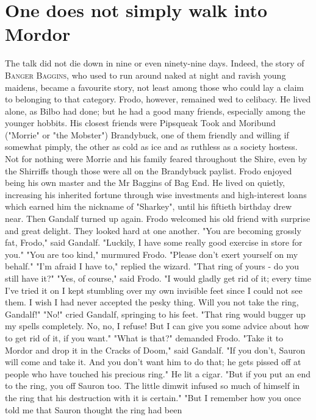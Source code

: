 \chapter[Concerning the Ring]{One does not simply walk into Mordor}

The talk did not die down in nine or even ninety-nine days. Indeed, the
story of \textcolor{RawSienna}{\textsc{\LARGE Banger Baggins}}, who used to run around naked at night and ravish
young maidens, became a favourite story, not least among those who could lay
a claim to belonging to that category. Frodo, however, remained wed to
celibacy. He lived alone, as Bilbo had done; but he had a good many friends,
especially among the younger hobbits. His closest friends were Pipsqueak
Took and Moribund ("Morrie" or "the Mobster") Brandybuck, one of them
friendly and willing if somewhat pimply, the other as cold as ice and as
ruthless as a society hostess. Not for nothing were Morrie and his family
feared throughout the Shire, even by the Shirriffs though those were all on
the Brandybuck paylist.
  Frodo enjoyed being his own master and the Mr Baggins of Bag End. He
lived on quietly, increasing his inherited fortune through wise investments
and high-interest loans which earned him the nickname of "Sharkey", until
his fiftieth birthday drew near. Then Gandalf turned up again. Frodo
welcomed his old friend with surprise and great delight. They looked hard at
one another.
  "You are becoming grossly fat, Frodo," said Gandalf. "Luckily, I have some
really good exercise in store for you."
  "You are too kind," murmured Frodo. "Please don't exert yourself on my
behalf."
  "I'm afraid I have to," replied the wizard. "That ring of yours - do you
still have it?"
  "Yes, of course," said Frodo. "I would gladly get rid of it; every time
I've tried it on I kept stumbling over my own invisible feet since I could
not see them. I wish I had never accepted the pesky thing. Will you not take
the ring, Gandalf!"
  "No!" cried Gandalf, springing to his feet. "That ring would bugger up my
spells completely. No, no, I refuse! But I can give you some advice about
how to get rid of it, if you want."
  "What is that?" demanded Frodo.
  "Take it to Mordor and drop it in the Cracks of Doom," said Gandalf. "If
you don't, Sauron will come and take it. And you don't want him to do that;
he gets pissed off at people who have touched his precious ring." He lit a
cigar. "But if you put an end to the ring, you off Sauron too. The little
dimwit infused so much of himself in the ring that his destruction with it
is certain."
  "But I remember how you once told me that Sauron thought the ring had been
